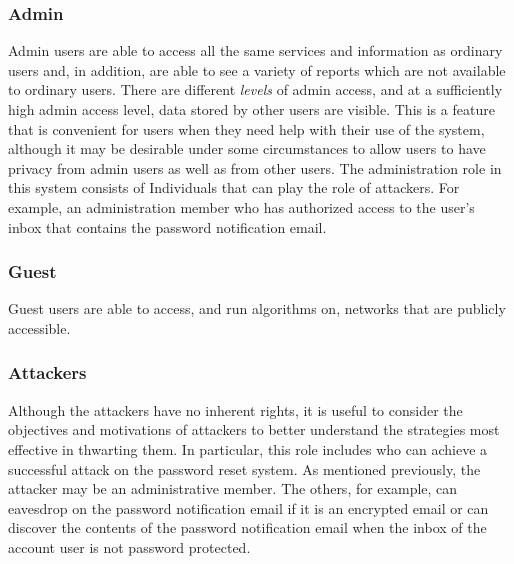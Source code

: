 \subsubsection{Admin}
Admin users are able to access all the same services and information as ordinary users and, in addition, are able to see a variety of reports which are not available to ordinary users. There are different {\em levels} of admin access, and at a sufficiently high admin access level, data stored by other users are visible. This is a feature that is convenient for users when they need help with their use of the system, although it may be desirable under some circumstances to allow users to have privacy from admin users as well as from other users. The administration role in this system consists of Individuals that can play the role of attackers. For example, an administration member who has authorized access to the user's inbox that contains the password notification email.

\subsubsection{Guest}
Guest users are able to access, and run algorithms on, networks that are publicly accessible.

\subsubsection{Attackers} 
Although the attackers have no inherent rights, it is useful to consider the objectives and motivations of attackers to better understand the strategies most effective in thwarting them. In particular, this role includes who can achieve a successful attack on the password reset system. As mentioned previously, the attacker may be an administrative member. The others, for example, can eavesdrop on the password notification email if it is an encrypted email or can discover the contents of the password notification email when the inbox of the account user is not password protected.


